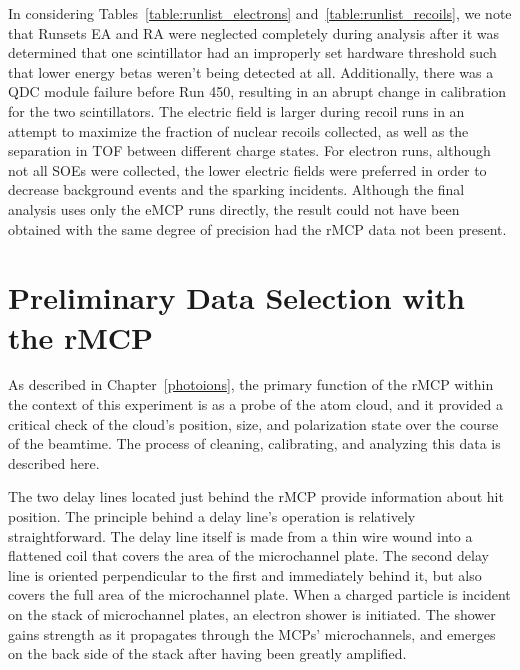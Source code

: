 In considering Tables~\ref{table:runlist_electrons} and~\ref{table:runlist_recoils}, we note that Runsets EA and RA were neglected completely during analysis after it was determined that one scintillator had an improperly set hardware threshold such that lower energy betas weren't being detected at all.  Additionally, there was a QDC module failure before Run 450, resulting in an abrupt change in calibration for the two scintillators.  The electric field is larger during recoil runs in an attempt to maximize the fraction of nuclear recoils collected, as well as the separation in TOF between different charge states.  For electron runs, although not all SOEs were collected, the lower electric fields were preferred in order to decrease background events and the sparking incidents.   Although the final analysis uses only the eMCP runs directly, the result could not have been obtained with the same degree of precision had the rMCP data not been present.  

\section{Preliminary Data Selection with the rMCP}
\label{sec:rmcp_cuts}
As described in Chapter~\ref{photoions}, the primary function of the rMCP within the context of this experiment is as a probe of the atom cloud, and it provided a critical check of the cloud's position, size, and polarization state over the course of the beamtime.  The process of cleaning, calibrating, and analyzing this data is described here.  

The two delay lines located just behind the rMCP provide information about hit position.  The principle behind a delay line's operation is relatively straightforward.  The delay line itself is made from a thin wire wound into a flattened coil that covers the area of the microchannel plate.  The second delay line is oriented perpendicular to the first and immediately behind it, but also covers the full area of the microchannel plate.  When a charged particle is incident on the stack of microchannel plates, an electron shower is initiated.  The shower gains strength as it propagates through the MCPs' microchannels, and emerges on the back side of the stack after having been greatly amplified.  

